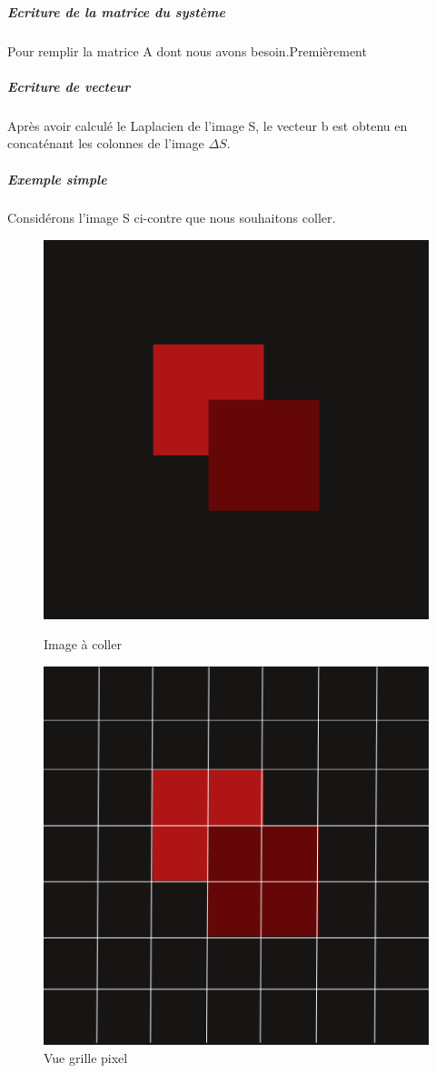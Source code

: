\subparagraph{Ecriture de la matrice du système}
Pour remplir la matrice A dont nous avons besoin.Premièrement

\subparagraph{Ecriture de vecteur}
Après avoir calculé le Laplacien de l'image S, le vecteur b est obtenu en concaténant les colonnes de l'image $\Delta S$. 

\subparagraph{Exemple simple}
Considérons l'image S ci-contre que nous souhaitons coller. 
\begin{figure}[!h]
\centering
\includegraphics[scale=0.1]{Images/square.png}
\caption{Image à coller}
\includegraphics[scale=0.1]{Images/pix.png}
\caption{Vue grille pixel}
\end{figure}
